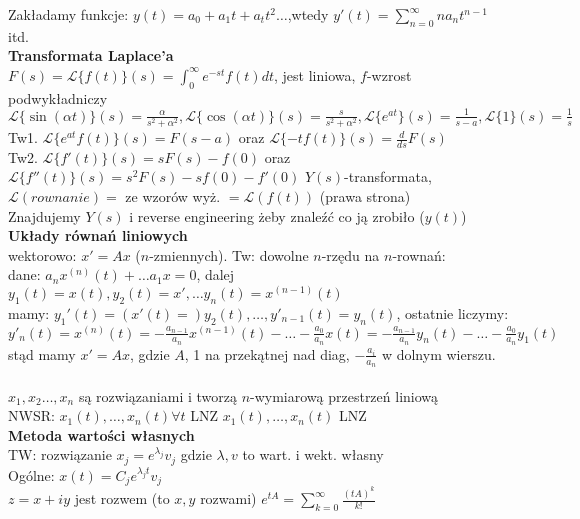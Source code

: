 \documentclass{article}
\begin{document}
Zakładamy funkcje: $y(t) = a_0 + a_1t + a_tt^2 \ldots$,wtedy $y'(t) = \sum_{n=0}^\infty na_nt^{n-1}$ itd.\\
\textbf{Transformata Laplace'a}\\
$F(s) = \mathcal{L}\{f(t)\}(s) = \int_0^\infty e^{-st}f(t)dt$, jest liniowa, $f$-wzrost podwykładniczy
$\mathcal{L}\{\sin{(\alpha t)}\}(s) = \frac{\alpha}{s^2 + \alpha^2},\mathcal{L}\{\cos{(\alpha t)}\}(s) = \frac{s}{s^2 + \alpha^2}, \mathcal{L}\{e^{at}\}(s) = \frac{1}{s-a}, \mathcal{L}\{1\}(s) = \frac{1}{s}$\\
Tw1. $\mathcal{L}\{e^{at}f(t)\}(s) = F(s-a)$ oraz $\mathcal{L}\{-tf(t)\}(s) = \frac{d}{ds}F(s)$\\
Tw2. $\mathcal{L}\{f'(t)\}(s) = sF(s) - f(0)$ oraz $\mathcal{L}\{f''(t)\}(s) = s^2F(s) - sf(0)-f'(0)$
$Y(s)$-transformata, $\mathcal{L}(rownanie) =$ ze wzorów wyż. $=\mathcal{L}(f(t))$ (prawa strona)\\
Znajdujemy $Y(s)$ i reverse engineering żeby znaleźć co ją zrobiło ($y(t)$)\\
\textbf{Układy równań liniowych}\\
wektorowo: $x' = Ax$ ($n$-zmiennych). Tw: dowolne $n$-rzędu na $n$-rownań:\\
dane: $a_nx^{(n)}(t) + \ldots a_1x = 0$, dalej $y_1(t) =x(t), y_2(t)=x', \ldots y_n(t)=x^{(n-1)}(t)$\\
mamy: $y_1'(t) = (x'(t) =) y_2(t), \ldots, y'_{n-1}(t) = y_n(t)$, ostatnie liczymy:
$y'_n(t) =x^{(n)}(t) = -\frac{a_{n-1}}{a_n}x^{(n-1)}(t) - \ldots -\frac{a_0}{a_n}x(t) = -\frac{a_{n-1}}{a_n}y_n(t) - \ldots -\frac{a_0}{a_n}y_1(t)$\\
stąd mamy $x'=Ax$, gdzie $A$, 1 na przekątnej nad diag, $-\frac{a_i}{a_n}$ w dolnym wierszu.\\\\
$x_1,x_2\ldots,x_n$ są rozwiązaniami i tworzą $n$-wymiarową przestrzeń liniową\\
NWSR: $x_1(t), \ldots, x_n(t) \forall t$ LNZ $x_1(t), \ldots, x_n(t)$ LNZ\\
\textbf{Metoda wartości własnych}\\
TW: rozwiązanie $x_j = e^{\lambda_j}v_j$ gdzie $\lambda, v$ to wart. i wekt. własny\\
Ogólne: $x(t) = C_je^{\lambda_jt}v_j$\\
$z = x + iy$ jest rozwem (to $x,y$ rozwami) \quad $e^{tA} = \sum_{k=0}^\infty \frac{(tA)^k}{k!}$\\
\\
\end{document}

